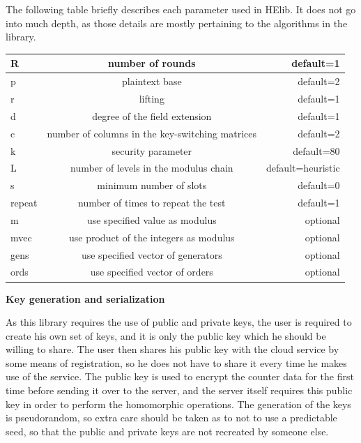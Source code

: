 The following table briefly describes each parameter used in HElib. It does not go into much depth, as those details are mostly pertaining to the algorithms in the library.

  \begin{tabular}{|l|c|r|}
    \hline 
    R  &     number of rounds &  default=1     \\ \hline
    p  &     plaintext base  & default=2  \\ \hline
    r  &     lifting  & default=1  \\ \hline
    d  &     degree of the field extension  & default=1  \\ \hline
    c  &     number of columns in the key-switching matrices  & default=2  \\ \hline
    k  &     security parameter & default=80  \\ \hline
    L  &     number of levels in the modulus chain  & default=heuristic  \\ \hline
    s  &     minimum number of slots  & default=0  \\ \hline
    repeat &  number of times to repeat the test & default=1  \\ \hline
    m   &    use specified value as modulus & optional  \\ \hline
    mvec &   use product of the integers as  modulus & optional \\ \hline
    gens &   use specified vector of generators & optional \\ \hline
    ords  &  use specified vector of orders & optional \\ \hline
  \end{tabular}


\textbf{Key generation and serialization}

As this library requires the use of public and private keys, the user is required to create his own set of keys, and it is only the public key which he should be willing to share. The user then shares his public key with the cloud service by some means of registration, so he does not have to share it every time he makes use of the service. The public key is used to encrypt the counter data for the first time before sending it over to the server, and the server itself requires this public key in order to perform the homomorphic operations.
The generation of the keys is pseudorandom, so extra care should be taken as to not to use a predictable seed, so that the public and private keys are not recreated by someone else. 

